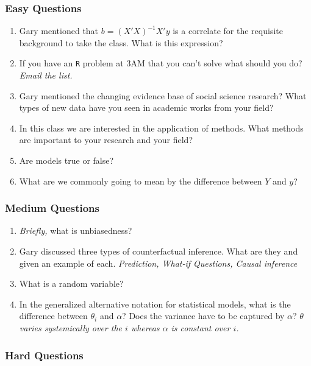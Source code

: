 \documentclass[11pt]{article}
\begin{document}
\subsubsection{Easy Questions}

\begin{enumerate}
\item Gary mentioned that $b = (X'X)^{-1}X'y$ is a correlate for the requisite background to take the class.  What is this expression? 
\item If you have an \texttt{R} problem at 3AM that you can't solve what should you do? \textit{Email the list.}
\item Gary mentioned the changing evidence base of social science research?  What types of new data have you seen in academic works from your field?
\item In this class we are interested in the application of methods.  What methods are important to your research and your field?
\item Are models true or false? 
\item What are we commonly going to mean by the difference between $Y$ and $y$? 
\end{enumerate}

\subsubsection{Medium Questions}

\begin{enumerate}
\item \textit{Briefly,} what is unbiasedness? 
\item Gary discussed three types of counterfactual inference.  What are they and given an example of each. \textit{Prediction, What-if Questions, Causal inference}
\item What is a random variable? 
\item In the generalized alternative notation for statistical models, what is the difference between $\theta_i$ and $\alpha$?  Does the variance have to be captured by $\alpha$? \textit{$\theta$ varies systemically over the $i$ whereas $\alpha$ is constant over $i$.} 
\end{enumerate}

\subsubsection{Hard Questions}
\end{document}
